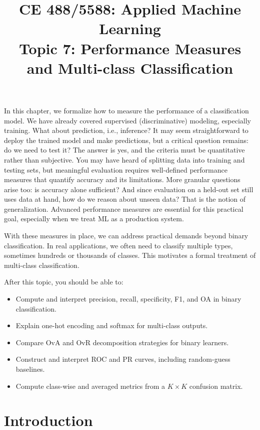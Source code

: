 \documentclass[12pt]{article}
\begin{document}
\doublespacing
\title{CE 488/5588: Applied Machine Learning\\ \large Topic 7: Performance Measures and Multi-class Classification}
\author{}
\date{}
\maketitle


In this chapter, we formalize how to measure the performance of a classification model. We have already covered supervised (discriminative) modeling, especially training. What about prediction, i.e., inference? It may seem straightforward to deploy the trained model and make predictions, but a critical question remains: do we need to test it? The answer is yes, and the criteria must be quantitative rather than subjective. You may have heard of splitting data into training and testing sets, but meaningful evaluation requires well-defined performance measures that quantify accuracy and its limitations. More granular questions arise too: is accuracy alone sufficient? And since evaluation on a held-out set still uses data at hand, how do we reason about unseen data? That is the notion of generalization. Advanced performance measures are essential for this practical goal, especially when we treat ML as a production system.

With these measures in place, we can address practical demands beyond binary classification. In real applications, we often need to classify multiple types, sometimes hundreds or thousands of classes. This motivates a formal treatment of multi-class classification.

 After this topic, you should be able to:
  \begin{itemize}
    \item Compute and interpret precision, recall, specificity, F1, and OA in binary classification.
    \item Explain one-hot encoding and softmax for multi-class outputs.
    \item Compare OvA and OvR decomposition strategies for binary learners.
    \item Construct and interpret ROC and PR curves, including random-guess baselines.
    \item Compute class-wise and averaged metrics from a $K\times K$ confusion matrix.
  \end{itemize}
  
\section{Introduction}
\end{document}
